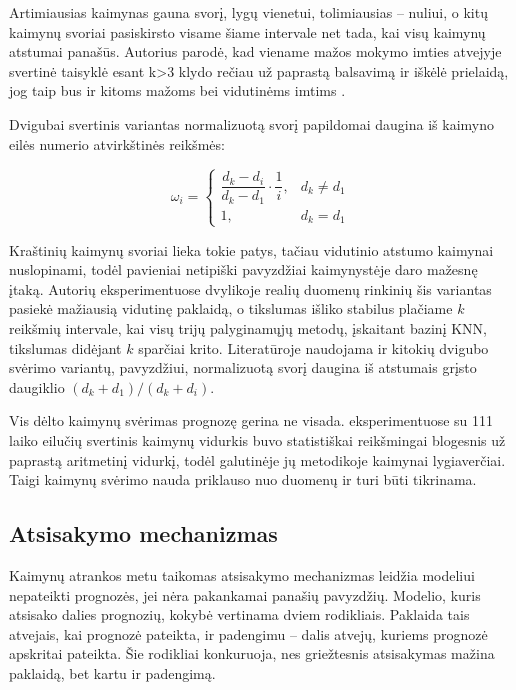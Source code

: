 Artimiausias kaimynas gauna svorį, lygų vienetui, tolimiausias -- nuliui, o kitų kaimynų svoriai pasiskirsto visame šiame intervale net tada, kai visų kaimynų atstumai panašūs.
Autorius parodė, kad viename mažos mokymo imties atvejyje svertinė taisyklė esant k>3 klydo rečiau už paprastą balsavimą ir iškėlė prielaidą, jog taip bus ir kitoms mažoms bei vidutinėms imtims \cite{dudani976}.

Dvigubai svertinis variantas \cite{gou2011} normalizuotą svorį papildomai daugina iš kaimyno eilės numerio atvirkštinės reikšmės:

\begin{equation}
    \omega_i =
    \begin{cases}
        \dfrac{d_k - d_i}{d_k - d_1} \cdot \dfrac{1}{i}, & d_k \neq d_1 \\[2ex]
        1, & d_k = d_1
    \end{cases}
    \label{eq:dwknn-svoris}
\end{equation}

Kraštinių kaimynų svoriai lieka tokie patys, tačiau vidutinio atstumo kaimynai nuslopinami, todėl pavieniai netipiški pavyzdžiai kaimynystėje daro mažesnę įtaką.
Autorių eksperimentuose dvylikoje realių duomenų rinkinių šis variantas pasiekė mažiausią vidutinę paklaidą, o tikslumas išliko stabilus plačiame $k$ reikšmių intervale, kai visų trijų palyginamųjų metodų, įskaitant bazinį KNN, tikslumas didėjant $k$ sparčiai krito.
Literatūroje naudojama ir kitokių dvigubo svėrimo variantų, pavyzdžiui, \cite{huang2017} normalizuotą svorį daugina iš atstumais grįsto daugiklio $(d_k + d_1)/(d_k + d_i)$.

Vis dėlto kaimynų svėrimas prognozę gerina ne visada.
\cite{martinez2019} eksperimentuose su 111 laiko eilučių svertinis kaimynų vidurkis buvo statistiškai reikšmingai blogesnis už paprastą aritmetinį vidurkį, todėl galutinėje jų metodikoje kaimynai lygiaverčiai.
Taigi kaimynų svėrimo nauda priklauso nuo duomenų ir turi būti tikrinama.


\subsection{Atsisakymo mechanizmas}

Kaimynų atrankos metu taikomas atsisakymo mechanizmas leidžia modeliui nepateikti prognozės, jei nėra pakankamai panašių pavyzdžių.
Modelio, kuris atsisako dalies prognozių, kokybė vertinama dviem rodikliais.
Paklaida tais atvejais, kai prognozė pateikta, ir padengimu -- dalis atvejų, kuriems prognozė apskritai pateikta.
Šie rodikliai konkuruoja, nes griežtesnis atsisakymas mažina paklaidą, bet kartu ir padengimą.

